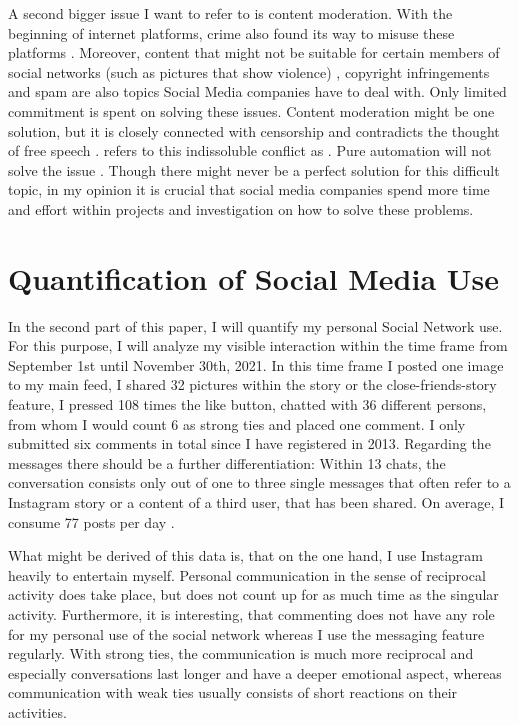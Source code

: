 \documentclass[11pt,letterpaper]{article}
\begin{document}
A second bigger issue I want to refer to is content moderation. With the beginning of internet platforms, crime also found its way to misuse these platforms \autocite[][]{Gupta.2021}. Moreover, content that might not be suitable for certain members of social networks (such as pictures that show violence) \autocite[][pp. 225 - 226]{Mengu.2015}, copyright infringements \autocite[][]{Hegemann.2019} and spam \autocite[][p. 1458]{Jin.2011} are also topics Social Media companies have to deal with. Only limited commitment  is spent on solving these issues. Content moderation might be one solution, but it is closely connected with censorship and contradicts the thought of free speech \autocite[][p. 1359]{Langvardt.2017}. \cite{Langvardt.2017} refers to this indissoluble conflict as . Pure automation will not solve the issue \autocite[][pp. 3 - 4]{Gillespie.2020}. Though there might never be a perfect solution for this difficult topic, in my opinion it is crucial that social media companies spend more time and effort within projects and investigation on how to solve these problems. 


\section*{Quantification of Social Media Use}
In the second part of this paper, I will quantify my personal Social Network use. For this purpose, I will analyze my visible interaction within the time frame from September 1st until November 30th, 2021. In this time frame I posted one image to my main feed, I shared 32 pictures within the story or the close-friends-story feature, I pressed 108 times the like button, chatted with 36 different persons, from whom I would count 6 as strong ties and placed one comment. I only submitted six comments in total since I have registered in 2013. Regarding the messages there should be a further differentiation: Within 13 chats, the conversation consists only out of one to three single messages that often refer to a Instagram story or a content of a third user, that has been shared. On average, I consume 77 posts per day \autocite[whole paragraph:][]{Instagram.2021}. 

What might be derived of this data is, that on the one hand, I use Instagram heavily to entertain myself. Personal communication in the sense of reciprocal activity does take place, but does not count up for as much time as the singular activity. Furthermore, it is interesting, that commenting does not have any role for my personal use of the social network whereas I use the messaging feature regularly. With strong ties, the communication is much more reciprocal and especially conversations last longer and have a deeper emotional aspect, whereas communication with weak ties usually consists of short reactions on their activities.
\end{document}
